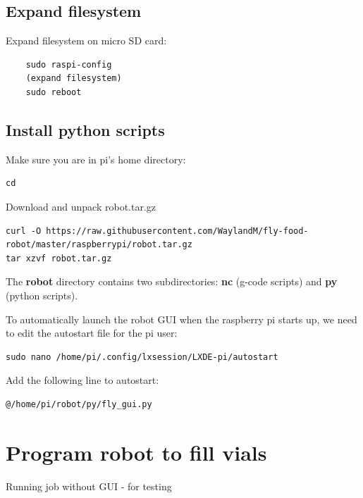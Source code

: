 \documentclass[]{book}
\theoremstyle{definition}
\theoremstyle{definition}
\theoremstyle{remark}
\begin{document}
\section{Expand filesystem}\label{expand-filesystem}

Expand filesystem on micro SD card:

\begin{verbatim}
    sudo raspi-config
    (expand filesystem)
    sudo reboot
\end{verbatim}

\section{Install python scripts}\label{installScripts}

Make sure you are in pi's home directory:

\begin{verbatim}
cd
\end{verbatim}

Download and unpack robot.tar.gz

\begin{verbatim}
curl -O https://raw.githubusercontent.com/WaylandM/fly-food-robot/master/raspberrypi/robot.tar.gz
tar xzvf robot.tar.gz
\end{verbatim}

The \textbf{robot} directory contains two subdirectories: \textbf{nc}
(g-code scripts) and \textbf{py} (python scripts).

To automatically launch the robot GUI when the raspberry pi starts up,
we need to edit the autostart file for the pi user:

\begin{verbatim}
sudo nano /home/pi/.config/lxsession/LXDE-pi/autostart
\end{verbatim}

Add the following line to autostart:

\begin{verbatim}
@/home/pi/robot/py/fly_gui.py
\end{verbatim}

\chapter{Program robot to fill vials}\label{gcode}

Running job without GUI - for testing
\end{document}

